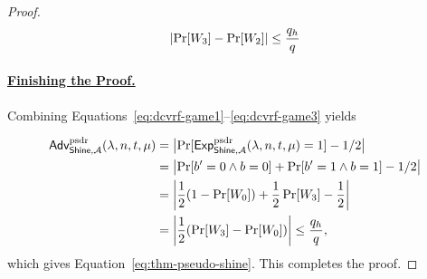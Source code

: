 \begin{proof}
  \begin{equation} \label{eq:dcvrf-game3}
    \lvert \Pr[W_3] - \Pr[W_2] \rvert \leq \frac{q_h}{q}
  \end{equation}

  \paragraph{\underline{Finishing the Proof.}}
  Combining Equations~\ref{eq:dcvrf-game1}--\ref{eq:dcvrf-game3} yields

  \begin{align*}
  \begin{split}
  \textsf{\upshape Adv}^{\textrm{\upshape psdr}}_{\mathsf{Shine},\mathcal{A}}(\lambda, n, t, \mu)
  & = \bigl| \Pr[ \textsf{\upshape Exp}^{\textrm{\upshape psdr}}_{\mathsf{Shine},\mathcal{A}}(\lambda, n, t, \mu) = 1] - 1/2 \bigr| \\
    & = \bigl| \Pr[ b'=0 \wedge b=0 ] + \Pr[ b'=1 \wedge b=1 ] - 1/2 \bigr| \\
  & = \left|\frac{1}{2}(1-\Pr[W_0]) + \frac{1}{2}\Pr[W_3] - \frac{1}{2}\right| \\
  & = \left|\frac{1}{2}(\Pr[W_3]- \Pr[W_0])\right| \le \frac{q_h}{q},
  \end{split}
  \end{align*}
  which gives Equation~\ref{eq:thm-pseudo-shine}.
  This completes the proof.
\end{proof}


